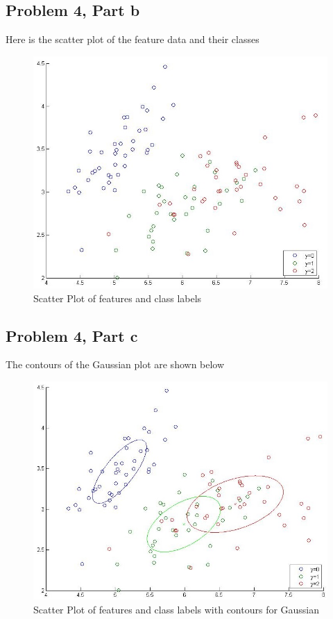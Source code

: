 \documentclass[11pt,psfig]{article}
\begin{document}
\newpage

\subsection*{Problem 4, Part b}

Here is the scatter plot of the feature data and their classes\\

\begin{figure}[H]
\centering
\includegraphics[width=\columnwidth]{prob4bScatter.jpg}
\caption{Scatter Plot of features and class labels}
\end{figure}

\newpage

\subsection*{Problem 4, Part c}

The contours of the Gaussian plot are shown below\\

\begin{figure}[H]
\centering
\includegraphics[width=\columnwidth]{prob4cScatter.jpg}
\caption{Scatter Plot of features and class labels with contours for Gaussian}
\end{figure}
\end{document}
